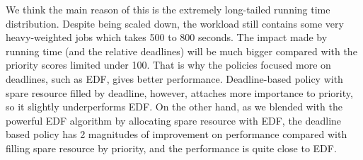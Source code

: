 We think the main reason of this is the extremely long-tailed running
time distribution.
Despite being scaled down, the workload still contains some very
heavy-weighted jobs which takes 500 to 800 seconds.
The impact made by running time (and the relative deadlines) will be
much bigger compared with the priority scores limited under 100.
That is why the policies focused more on deadlines, such as EDF, gives
better performance.
Deadline-based policy with spare resource filled by deadline, however,
attaches more importance to priority, so it slightly underperforms EDF.
On the other hand, as we blended with the powerful EDF algorithm by
allocating spare resource with EDF, the deadline based policy has 2
magnitudes of improvement on performance compared with filling spare
resource by priority, and the performance is quite close to EDF.

